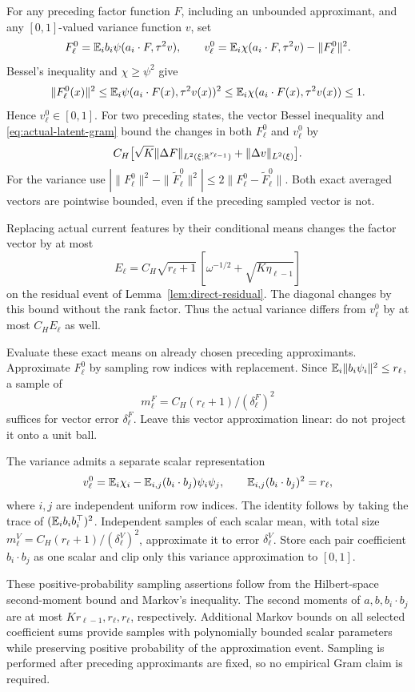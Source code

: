 For any preceding factor function $F$, including an unbounded approximant, and any $[0,1]$-valued variance function $v$, set
\[
 F_\ell^0=\mathbb E_i b_i\psi(a_i\cdot F,\tau^2v),\qquad
 v_\ell^0=\mathbb E_i\chi(a_i\cdot F,\tau^2v)-\|F_\ell^0\|^2.
\]
Bessel's inequality and $\chi\ge\psi^2$ give
\[
 \|F_\ell^0(x)\|^2\le\mathbb E_i\psi(a_i\cdot F(x),\tau^2v(x))^2
 \le\mathbb E_i\chi(a_i\cdot F(x),\tau^2v(x))\le1.
\]
Hence $v_\ell^0\in[0,1]$. For two preceding states, the vector Bessel inequality and \eqref{eq:actual-latent-gram} bound the changes in both $F_\ell^0$ and $v_\ell^0$ by
\begin{equation}
 C_H\big[\sqrt K\|\Delta F\|_{L^2(\xi;\mathbb R^{r_{\ell-1}})}+\|\Delta v\|_{L^2(\xi)}\big].
 \label{eq:separate-propagation}
\end{equation}
For the variance use $|\|F_\ell^0\|^2-\|\widetilde F_\ell^0\|^2|\le2\|F_\ell^0-\widetilde F_\ell^0\|$. Both exact averaged vectors are pointwise bounded, even if the preceding sampled vector is not.

Replacing actual current features by their conditional means changes the factor vector by at most
\[
 E_\ell=C_H\sqrt{r_\ell+1}\,[\omega^{-1/2}+\sqrt{K\eta_{\ell-1}}]
\]
on the residual event of Lemma~\ref{lem:direct-residual}. The diagonal changes by this bound without the rank factor. Thus the actual variance differs from $v_\ell^0$ by at most $C_HE_\ell$ as well.

Evaluate these exact means on already chosen preceding approximants. Approximate $F_\ell^0$ by sampling row indices with replacement. Since $\mathbb E_i\|b_i\psi_i\|^2\le r_\ell$, a sample of
\[
 m_\ell^F=C_H(r_\ell+1)/(\delta_\ell^F)^2
\]
suffices for vector error $\delta_\ell^F$. Leave this vector approximation linear: do not project it onto a unit ball.

The variance admits a separate scalar representation
\begin{equation}
 v_\ell^0=\mathbb E_i\chi_i-\mathbb E_{i,j}(b_i\cdot b_j)\psi_i\psi_j,
 \qquad \mathbb E_{i,j}(b_i\cdot b_j)^2=r_\ell,
 \label{eq:pair-variance}
\end{equation}
where $i,j$ are independent uniform row indices. The identity follows by taking the trace of $(\mathbb E_i b_i b_i^\top)^2$. Independent samples of each scalar mean, with total size
$m_\ell^V=C_H(r_\ell+1)/(\delta_\ell^V)^2$, approximate it to error $\delta_\ell^V$. Store each pair coefficient $b_i\cdot b_j$ as one scalar and clip only this variance approximation to $[0,1]$.

These positive-probability sampling assertions follow from the Hilbert-space second-moment bound and Markov's inequality. The second moments of $a,b,b_i\cdot b_j$ are at most $Kr_{\ell-1},r_\ell,r_\ell$, respectively. Additional Markov bounds on all selected coefficient sums provide samples with polynomially bounded scalar parameters while preserving positive probability of the approximation event. Sampling is performed after preceding approximants are fixed, so no empirical Gram claim is required.

